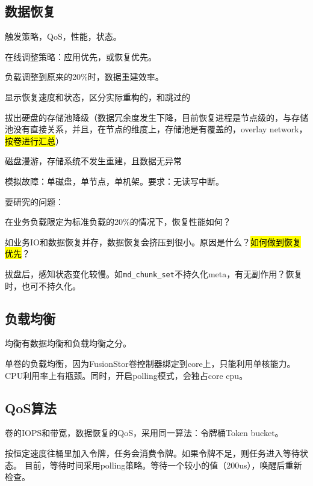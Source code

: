 \subsection{数据恢复}

触发策略，QoS，性能，状态。

\begin{enumbox}
\item 在线调整策略：应用优先，或恢复优先。
\item 负载调整到原来的20\%时，数据重建效率。
\item 显示恢复速度和状态，区分实际重构的，和跳过的
\item 拔出硬盘的存储池降级（数据冗余度发生下降，目前恢复进程是节点级的，与存储池没有直接关系，并且，在节点的维度上，存储池是有覆盖的，overlay network，\hl{按卷进行汇总}）
\item 磁盘漫游，存储系统不发生重建，且数据无异常
\item 模拟故障：单磁盘，单节点，单机架。要求：无读写中断。
\end{enumbox}

要研究的问题：
\begin{enumbox}
\item 在业务负载限定为标准负载的20\%的情况下，恢复性能如何？
\item 如业务IO和数据恢复并存，数据恢复会挤压到很小。原因是什么？\hl{如何做到恢复优先}？
\item 拔盘后，感知状态变化较慢。如\verb|md_chunk_set|不持久化meta，有无副作用？恢复时，也可不持久化。
\end{enumbox}

\subsection{负载均衡}

均衡有数据均衡和负载均衡之分。

单卷的负载均衡，因为FusionStor卷控制器绑定到core上，只能利用单核能力。
CPU利用率上有瓶颈。同时，开启polling模式，会独占core cpu。

\subsection{QoS算法}

卷的IOPS和带宽，数据恢复的QoS，采用同一算法：令牌桶Token bucket。

按恒定速度往桶里加入令牌，任务会消费令牌。如果令牌不足，则任务进入等待状态。
目前，等待时间采用polling策略。等待一个较小的值（200us），唤醒后重新检查。

